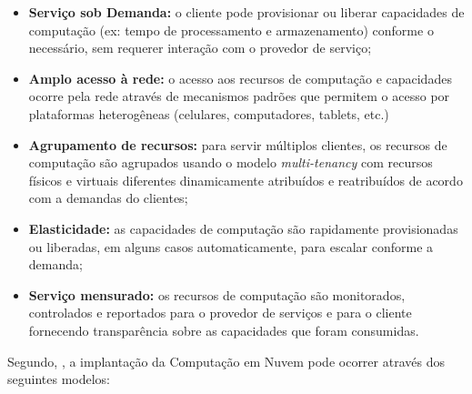 \begin{itemize}
    
    \item \textbf{Serviço sob Demanda:} o cliente pode provisionar ou liberar
    capacidades de computação (ex: tempo de processamento e armazenamento) conforme o
    necessário, sem requerer interação com o provedor de serviço;
    
    \item \textbf{Amplo acesso à rede:} o acesso aos recursos de computação e
    capacidades ocorre pela rede através de mecanismos padrões que permitem o
    acesso por plataformas heterogêneas (celulares, computadores, tablets, etc.)
      
    \item \textbf{Agrupamento de recursos:} para servir múltiplos clientes, os
    recursos de computação são agrupados usando o modelo \emph{multi-tenancy}
    com recursos físicos e virtuais diferentes dinamicamente atribuídos e
    reatribuídos de acordo com a demandas do clientes;
    
    \item \textbf{Elasticidade:} as capacidades de computação são rapidamente
    provisionadas ou liberadas, em alguns casos automaticamente, para escalar
    conforme a demanda;
    
    \item \textbf{Serviço mensurado:} os recursos de computação são monitorados,
    controlados e reportados para o provedor de serviços e para o cliente
    fornecendo transparência sobre as capacidades que foram consumidas.

\end{itemize}

Segundo, , a implantação da Computação em Nuvem pode
ocorrer através dos seguintes modelos:

